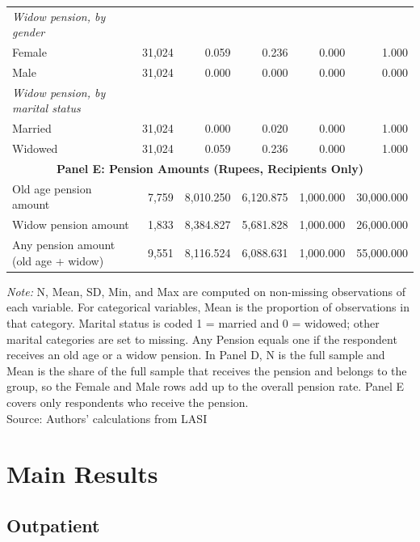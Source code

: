 \documentclass[
  11pt,
]{article}
\begin{document}
\begin{table}
{{\begin{tabular}{lrrrrr}
\textit{\quad Widow pension, by gender} & & & & & \\
\quad \quad Female & 31,024 & 0.059 & 0.236 & 0.000 & 1.000 \\
\quad \quad Male & 31,024 & 0.000 & 0.000 & 0.000 & 0.000 \\
\textit{\quad Widow pension, by marital status} & & & & & \\
\quad \quad Married & 31,024 & 0.000 & 0.020 & 0.000 & 1.000 \\
\quad \quad Widowed & 31,024 & 0.059 & 0.236 & 0.000 & 1.000 \\
\midrule
\multicolumn{6}{c}{\textbf{Panel E: Pension Amounts (Rupees, Recipients Only)}} \\
\midrule
Old age pension amount & 7,759 & 8,010.250 & 6,120.875 & 1,000.000 & 30,000.000 \\
Widow pension amount & 1,833 & 8,384.827 & 5,681.828 & 1,000.000 & 26,000.000 \\
Any pension amount (old age + widow) & 9,551 & 8,116.524 & 6,088.631 & 1,000.000 & 55,000.000 \\
\bottomrule
\end{tabular}
}
\vspace{2mm}
\begin{minipage}{0.95\textwidth}
\footnotesize \textit{Note:} N, Mean, SD, Min, and Max are computed on non-missing observations of each variable. For categorical variables, Mean is the proportion of observations in that category. Marital status is coded 1 = married and 0 = widowed; other marital categories are set to missing. Any Pension equals one if the respondent receives an old age or a widow pension. In Panel D, N is the full sample and Mean is the share of the full sample that receives the pension and belongs to the group, so the Female and Male rows add up to the overall pension rate. Panel E covers only respondents who receive the pension. \\
Source: Authors' calculations from LASI
\end{minipage}

}

\end{table}%

\section{Main Results}\label{main-results}

\subsection{Outpatient}\label{outpatient}
\end{document}
